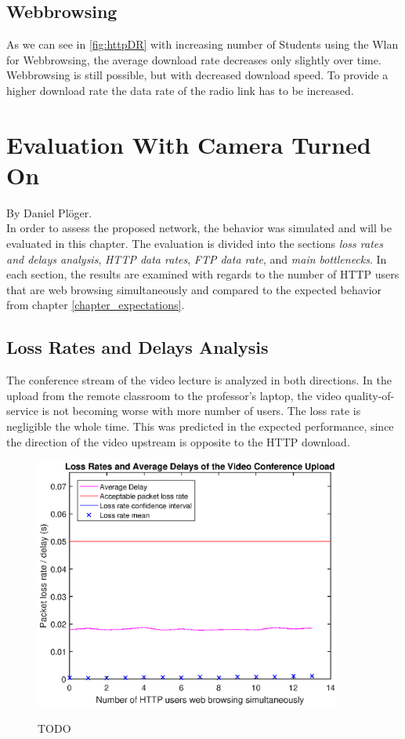 \documentclass[a4paper,10pt]{book}\usepackage{graphicx}
\begin{document}
\section{Webbrowsing}
As we can see in \ref{fig:httpDR} with increasing number of Students using the Wlan for Webbrowsing, the average download rate decreases only slightly over time. Webbrowsing is still possible, but with decreased download speed.
To provide a higher download rate the data rate of the radio link has to be increased. 



\chapter{Evaluation With Camera Turned On}
By Daniel Plöger.\\

In order to assess the proposed network, the behavior was simulated and will be evaluated in this chapter. The evaluation is divided into the sections \textit{loss rates and delays analysis}, \textit{HTTP data rates}, \textit{FTP data rate}, and \textit{main bottlenecks}. In each section, the results are examined with regards to the number of HTTP users that are web browsing simultaneously and compared to the expected behavior from chapter \ref{chapter_expectations}.

\section{Loss Rates and Delays Analysis}

The conference stream of the video lecture is analyzed in both directions. In the upload from the remote classroom to the professor's laptop, the video quality-of-service is not becoming worse with more number of users. The loss rate is  negligible the whole time. This was predicted in the expected performance, since the direction of the video upstream is opposite to the HTTP download.

\begin{figure}[!ht]
  \centering
    \includegraphics[width=0.9\textwidth]{on_loss_conf_upload.eps}
    \label{fig:on_loss_conf_upload}
    \caption{TODO}
\end{figure}
\end{document}
